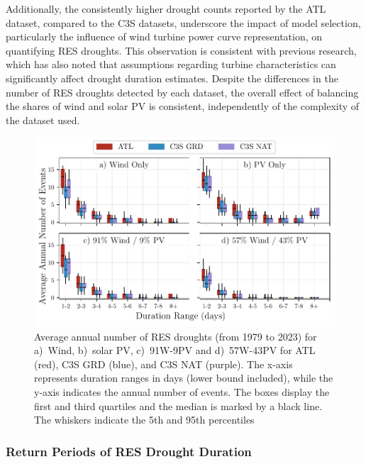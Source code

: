 \documentclass[preprint, 12pt]{elsarticle}
\begin{document}
Additionally, the consistently higher drought counts reported by the ATL dataset, compared to the C3S datasets, underscore the impact of model selection, particularly the influence of wind turbine power curve representation, on quantifying RES droughts. This observation is consistent with previous research, which has also noted that assumptions regarding turbine characteristics can significantly affect drought duration estimates. Despite the differences in the number of RES droughts detected by each dataset, the overall effect of balancing the shares of wind and solar PV is consistent, independently of the complexity of the dataset used.

\begin{figure}[!ht]
	\centering
	\includegraphics[width=\textwidth]{droughts_number_events.pdf}
	\caption{Average annual number of RES droughts (from 1979 to 2023) for a)~Wind, b)~solar PV, c)~91W-9PV and d)~57W-43PV for ATL (red), C3S GRD (blue), and C3S NAT (purple). The x-axis represents duration ranges in days (lower bound included), while the y-axis indicates the annual number of events. The boxes display the first and third quartiles and the median is marked by a black line. The whiskers indicate the 5th and 95th percentiles}
	\label{fig:boxplot_number_events}	
\end{figure}

\subsubsection{Return Periods of RES Drought Duration}
\end{document}

